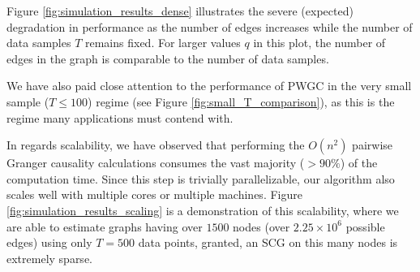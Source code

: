 Figure \ref{fig:simulation_results_dense} illustrates the severe
(expected) degradation in performance as the number of edges increases
while the number of data samples $T$ remains fixed.  For larger values
$q$ in this plot, the number of edges in the graph is comparable to
the number of data samples.

We have also paid close attention to the performance of PWGC in the
very small sample ($T \le 100$) regime (see Figure
\ref{fig:small_T_comparison}), as this is the regime many applications
must contend with.

In regards scalability, we have observed that performing the $O(n^2)$
pairwise Granger causality calculations consumes the vast majority
($> 90\%$) of the computation time.  Since this step is trivially
parallelizable, our algorithm also scales well with multiple cores or
multiple machines.  Figure \ref{fig:simulation_results_scaling} is a
demonstration of this scalability, where we are able to estimate
graphs having over $1500$ nodes (over $2.25 \times 10 ^6$ possible edges)
using only $T = 500$ data points, granted, an SCG on this many nodes
is extremely sparse.

\clearpage
